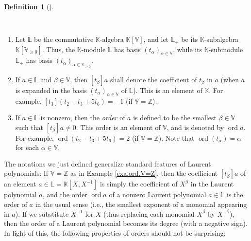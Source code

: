 \documentclass[numbers=enddot,12pt,final,onecolumn,notitlepage]{scrartcl}%
\theoremstyle{definition}
\newtheorem{defi}[theo]{Definition}
\newenvironment{definition}[1][]
{\begin{defi}[#1]\begin{leftbar}}
{\end{leftbar}\end{defi}}
\renewcommand{\geq}{\geqslant}
\theoremstyle{plainsl}
\begin{document}
\begin{definition}
\ 

\begin{enumerate}
\item[\textbf{(a)}] Let $\mathbb{L}$ be the commutative $\mathbb{K}$-algebra
$\mathbb{K}\left[  \mathbb{V}\right]  $, and let $\mathbb{L}_{+}$ be its
$\mathbb{K}$-subalgebra $\mathbb{K}\left[  \mathbb{V}_{\geq0}\right]  $. Thus,
the $\mathbb{K}$-module $\mathbb{L}$ has basis $\left(  t_{\alpha}\right)
_{\alpha\in\mathbb{V}}$, while its $\mathbb{K}$-submodule $\mathbb{L}_{+}$ has
basis $\left(  t_{\alpha}\right)  _{\alpha\in\mathbb{V}_{\geq0}}$.

\item[\textbf{(b)}] If $a\in\mathbb{L}$ and $\beta\in\mathbb{V}$, then
$\left[  t_{\beta}\right]  a$ shall denote the coefficient of $t_{\beta}$ in
$a$ (when $a$ is expanded in the basis $\left(  t_{\alpha}\right)  _{\alpha
\in\mathbb{V}}$ of $\mathbb{L}$). This is an element of $\mathbb{K}$. For
example, $\left[  t_{3}\right]  \left(  t_{2}-t_{3}+5t_{6}\right)  =-1$ (if
$\mathbb{V}=\mathbb{Z}$).

\item[\textbf{(c)}] If $a\in\mathbb{L}$ is nonzero, then the \textit{order} of
$a$ is defined to be the smallest $\beta\in\mathbb{V}$ such that $\left[
t_{\beta}\right]  a\neq0$. This order is an element of $\mathbb{V}$, and is
denoted by $\operatorname*{ord}a$. For example, $\operatorname*{ord}\left(
t_{2}-t_{3}+5t_{6}\right)  =2$ (if $\mathbb{V}=\mathbb{Z}$). Note that
$\operatorname*{ord}\left(  t_{\alpha}\right)  =\alpha$ for each $\alpha
\in\mathbb{V}$.
\end{enumerate}
\end{definition}

The notations we just defined generalize standard features of Laurent
polynomials: If $\mathbb{V}=\mathbb{Z}$ as in Example \ref{exa.ord.V=Z}, then
the coefficient $\left[  t_{\beta}\right]  a$ of an element $a\in
\mathbb{L}=\mathbb{K}\left[  X,X^{-1}\right]  $ is simply the coefficient of
$X^{\beta}$ in the Laurent polynomial $a$, and the order $\operatorname*{ord}%
a$ of a nonzero Laurent polynomial $a\in\mathbb{L}$ is the order of $a$ in the
usual sense (i.e., the smallest exponent of a monomial appearing in $a$). If
we substitute $X^{-1}$ for $X$ (thus replacing each monomial $X^{\beta}$ by
$X^{-\beta}$), then the order of a Laurent polynomial becomes its degree (with
a negative sign). In light of this, the following properties of orders should
not be surprising:
\end{document}
